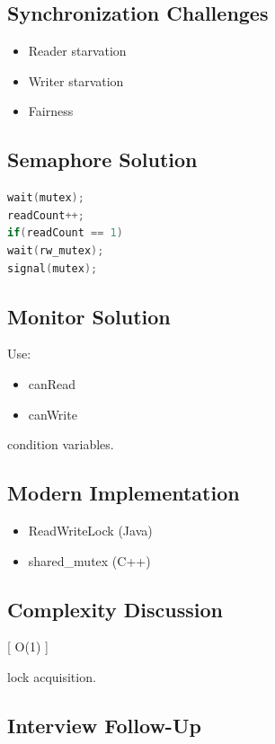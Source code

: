 \subsection{Synchronization Challenges}

\begin{itemize}
\item Reader starvation
\item Writer starvation
\item Fairness
\end{itemize}

\subsection{Semaphore Solution}

\begin{lstlisting}[language=C,style=interviewcode]
wait(mutex);
readCount++;
if(readCount == 1)
wait(rw_mutex);
signal(mutex);
\end{lstlisting}

\subsection{Monitor Solution}

Use:

\begin{itemize}
\item canRead
\item canWrite
\end{itemize}

condition variables.

\subsection{Modern Implementation}

\begin{itemize}
\item ReadWriteLock (Java)
\item shared_mutex (C++)
\end{itemize}

\subsection{Complexity Discussion}

[
O(1)
]

lock acquisition.

\subsection{Interview Follow-Up}


